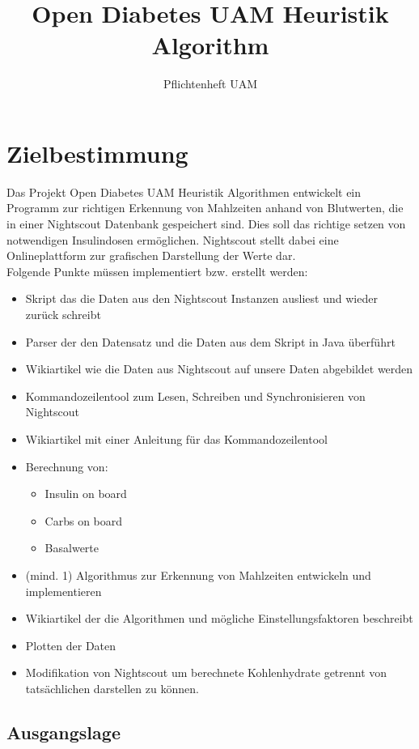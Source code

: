 \documentclass[accentcolor=tud0b,12pt,paper=a4]{tudreport}
\title{Open Diabetes UAM Heuristik Algorithm}
\subtitle{Pflichtenheft UAM}
\begin{document}
	\maketitle
	\tableofcontents 
	\newpage
	\chapter{Zielbestimmung}
	
	Das Projekt Open Diabetes UAM Heuristik Algorithmen entwickelt ein Programm zur richtigen Erkennung von Mahlzeiten anhand von Blutwerten, die in einer Nightscout Datenbank gespeichert sind. Dies soll das richtige setzen von notwendigen Insulindosen ermöglichen. Nightscout stellt dabei eine Onlineplattform zur grafischen Darstellung der Werte dar. \\

Folgende Punkte müssen implementiert bzw. erstellt werden:

\begin{itemize}
	\item Skript das die Daten aus den Nightscout Instanzen ausliest und wieder zurück schreibt
	\item Parser der den Datensatz und die Daten aus dem Skript in Java überführt
	\item Wikiartikel wie die Daten aus Nightscout auf unsere Daten abgebildet werden
	\item Kommandozeilentool zum Lesen, Schreiben und Synchronisieren von Nightscout
	\item Wikiartikel mit einer Anleitung für das Kommandozeilentool
	\item Berechnung von:
	\begin{itemize}
		\item Insulin on board
		\item Carbs on board
		\item Basalwerte
	\end{itemize}
	\item (mind. 1) Algorithmus zur Erkennung von Mahlzeiten entwickeln und implementieren
	\item Wikiartikel der die Algorithmen und mögliche Einstellungsfaktoren beschreibt
	\item Plotten der Daten
	\item Modifikation von Nightscout um berechnete Kohlenhydrate getrennt von tatsächlichen darstellen zu können.
\end{itemize}	
	\section{Ausgangslage}
\end{document}
